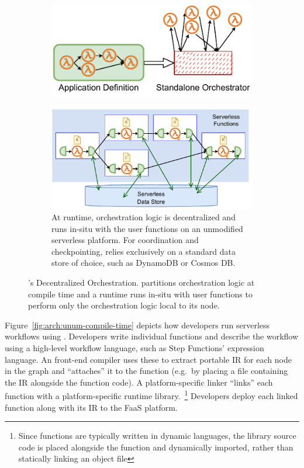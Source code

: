 \begin{figure}[t!]
\begin{subfigure}[t]{0.8\textwidth}
	\end{subfigure}
	\begin{subfigure}[b]{\columnwidth}
		\centering
		\includegraphics[width=0.8\columnwidth]{figures/unum-arch-centralized.pdf}
		\caption{
		\label{fig:arch:centralized}}
	\end{subfigure}
	\hfill
	\begin{subfigure}[b]{\columnwidth}
		\centering
		\includegraphics[width=.7\columnwidth]{figures/unum-arch-runtime.pdf}
		\caption{At runtime, \name{} orchestration logic is decentralized and
			runs in-situ with the user functions on an unmodified serverless
			platform. For coordination and checkpointing,
			\name{} relies exclusively on a standard data store of choice, such
			as DynamoDB or Cosmos DB.}
		\label{fig:arch:unum-runtime}
	\end{subfigure}
	\caption{\name{}'s Decentralized Orchestration. \name{} partitions
	orchestration logic at compile time and a \name{} runtime runs in-situ
	with user functions to perform only the orchestration logic local to its
	node.}
	\label{fig:arch}
\end{figure}

Figure~\ref{fig:arch:unum-compile-time} depicts how developers run serverless
workflows using \name{}. Developers write individual functions and describe the
workflow using a high-level workflow language, such as Step Functions'
expression language. An \name{} front-end compiler uses these to extract
portable \name{} IR for each node in the graph and ``attaches'' it to the
function (e.g.\ by placing a file containing the IR alongside the function
code). A platform-specific \name{} linker ``links'' each function with a
platform-specific \name{} runtime library.~\footnote{Since functions are
typically written in dynamic languages, the \name{} library source code is
placed alongside the function and dynamically imported, rather than statically
linking an object file} Developers deploy each linked function along with its IR
to the FaaS platform.

